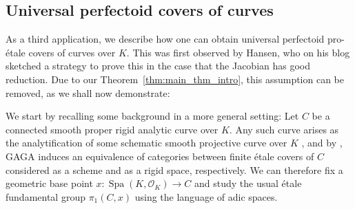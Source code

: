 \documentclass[10pt,oneside]{amsart}
\theoremstyle{definition}
\newcommand{\Spa}{\operatorname{Spa}}
\renewcommand{\O}{\mathcal{O}}
\begin{document}
	\subsection{Universal perfectoid covers of curves}
	
As a third application, we describe how one can obtain universal perfectoid pro-\'etale covers of curves over $K$. This was first observed by Hansen, who on his blog sketched a strategy to prove this in the case that the Jacobian has good reduction. Due to our Theorem~\ref{thm:main_thm_intro}, this assumption can be removed, as we shall now demonstrate:
	
	We start by recalling some background in a more general setting: Let $C$ be a connected smooth proper rigid analytic curve over $K$. Any such curve arises as the analytification of some schematic smooth projective curve over $K$ \cite[Theorem 1.8.1]{Lut}, and by \cite[Theorem 3.1]{LutRiemann}, GAGA induces an equivalence of categories between finite \'etale covers of $C$ considered as a scheme and as a rigid  space, respectively. We can therefore fix a geometric base point $x:\Spa({K},\O_{{K}})\to C$ and study the usual \'etale fundamental group $\pi_1(C,x)$ using the language of adic spaces. 
	
\end{document}
